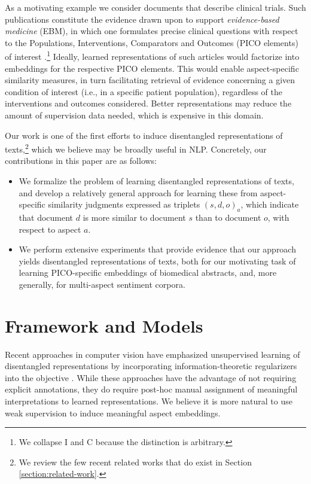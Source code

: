 \documentclass[11pt,a4paper]{article}
\begin{document}
As a motivating example we consider documents that describe clinical trials. Such publications constitute the evidence drawn upon to support \emph{evidence-based medicine} (EBM), in which one formulates precise clinical questions with respect to the Populations, Interventions, Comparators and Outcomes (PICO elements) of interest \cite{sackett1996evidence}.\footnote{We collapse I and C because the distinction is arbitrary.} Ideally, learned representations of such articles would factorize into embeddings for the respective PICO elements. This would enable aspect-specific similarity measures, in turn facilitating retrieval of evidence concerning a given condition of interest (i.e., in a specific patient population), regardless of the interventions and outcomes considered. Better representations may reduce the amount of supervision data needed, which is expensive in this domain.

Our work is one of the first efforts to induce disentangled representations of texts,\footnote{We review the few recent related works that do exist in Section \ref{section:related-work}.} which we believe may be broadly useful in NLP. Concretely, our contributions in this paper are as follows:

\vspace{-.4em}
\begin{itemize}[leftmargin=1.0em]
\item We formalize the problem of learning disentangled representations of texts, and develop a relatively general approach for learning these from aspect-specific similarity judgments expressed as triplets $(s, d, o)_a$, which indicate that document $d$ is more similar to document $s$ than to document $o$, with respect to aspect $a$.
\vspace{-.5em}
\item We perform extensive experiments that provide evidence that our approach yields disentangled representations of texts, both for our motivating task of learning PICO-specific embeddings of biomedical abstracts, and, more generally, for multi-aspect sentiment corpora.
\end{itemize}

\vspace{-.65em}
\section{Framework and Models}
\vspace{-.5em}
Recent approaches in computer vision have emphasized unsupervised learning of disentangled representations by incorporating information-theoretic regularizers into the objective \cite{chen2016infogan,higgins2017beta-vae}. While these approaches have the advantage of not requiring explicit annotations, they do require post-hoc manual assignment of meaningful interpretations to learned representations. We believe it is more natural to use weak supervision to induce meaningful aspect embeddings.
\end{document}

